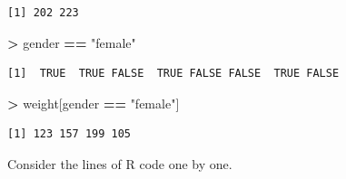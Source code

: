 \documentclass[
]{krantz}
\makeatletter
\newenvironment{Shaded}{\begin{snugshade}}{\end{snugshade}}
\newcommand{\NormalTok}[1]{#1}
\newcommand{\OperatorTok}[1]{\textcolor[rgb]{0.43,0.43,0.43}{\textbf{#1}}}
\newcommand{\StringTok}[1]{\textcolor[rgb]{0.5,0.5,0.5}{#1}}
\newenvironment{kframe}{%
\medskip{}
\setlength{\fboxsep}{.8em}
 \def\at@end@of@kframe{}%
 \ifinner\ifhmode%
  \def\at@end@of@kframe{\end{minipage}}%
  \begin{minipage}{\columnwidth}%
 \fi\fi%
 \def\FrameCommand##1{\hskip\@totalleftmargin \hskip-\fboxsep
 \colorbox{shadecolor}{##1}\hskip-\fboxsep
     \hskip-\linewidth \hskip-\@totalleftmargin \hskip\columnwidth}%
 \MakeFramed {\advance\hsize-\width
   \@totalleftmargin\z@ \linewidth\hsize
   \@setminipage}}%
 {\par\unskip\endMakeFramed%
 \at@end@of@kframe}
\renewenvironment{Shaded}{\begin{kframe}}{\end{kframe}}
\makeatother
\begin{document}
\begin{verbatim}
[1] 202 223
\end{verbatim}

\begin{Shaded}
\begin{Highlighting}[]
\OperatorTok{\textgreater{}}\StringTok{ }\NormalTok{gender }\OperatorTok{==}\StringTok{ "female"}
\end{Highlighting}
\end{Shaded}

\begin{verbatim}
[1]  TRUE  TRUE FALSE  TRUE FALSE FALSE  TRUE FALSE
\end{verbatim}

\begin{Shaded}
\begin{Highlighting}[]
\OperatorTok{\textgreater{}}\StringTok{ }\NormalTok{weight[gender }\OperatorTok{==}\StringTok{ "female"}\NormalTok{]}
\end{Highlighting}
\end{Shaded}

\begin{verbatim}
[1] 123 157 199 105
\end{verbatim}

Consider the lines of R code one by one.
\end{document}
